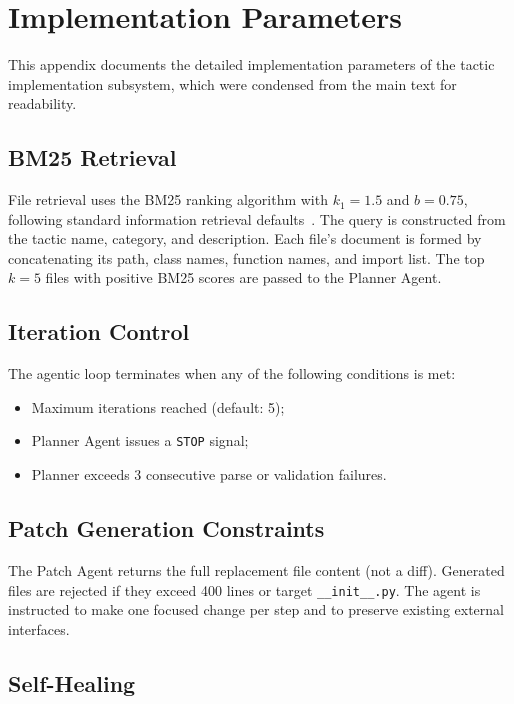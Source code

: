\appendix
\chapter{Implementation Parameters}
\label{app:impl_params}

This appendix documents the detailed implementation parameters of the tactic implementation subsystem, which were condensed from the main text for readability.

\section{BM25 Retrieval}
\label{sec:app_bm25}

File retrieval uses the BM25 ranking algorithm with $k_1 = 1.5$ and $b = 0.75$, following standard information retrieval defaults~\cite{robertson2009probabilistic}. The query is constructed from the tactic name, category, and description. Each file's document is formed by concatenating its path, class names, function names, and import list. The top $k = 5$ files with positive BM25 scores are passed to the Planner Agent.

\section{Iteration Control}

The agentic loop terminates when any of the following conditions is met:

\begin{itemize}
    \item Maximum iterations reached (default: 5);
    \item Planner Agent issues a \texttt{STOP} signal;
    \item Planner exceeds 3 consecutive parse or validation failures.
\end{itemize}

\section{Patch Generation Constraints}

The Patch Agent returns the full replacement file content (not a diff). Generated files are rejected if they exceed 400 lines or target \texttt{\_\_init\_\_.py}. The agent is instructed to make one focused change per step and to preserve existing external interfaces.

\section{Self-Healing}

